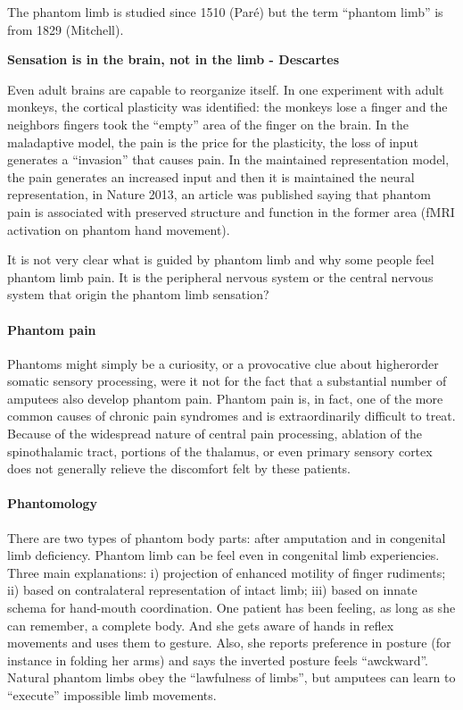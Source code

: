 \documentclass[12pt,article,oneside,a4paper]{memoir}
\begin{document}
The phantom limb is studied since 1510 (Paré) but the term ``phantom limb''
is from 1829 (Mitchell).

\textbf{Sensation is in the brain, not in the limb - Descartes}

Even adult brains are capable to reorganize itself. In one experiment with adult
monkeys, the cortical plasticity was identified: the monkeys lose a finger and
the neighbors fingers took the ``empty'' area of the finger on the brain.
In the maladaptive model, the pain is the price for the plasticity, the loss
of input generates a ``invasion'' that causes pain.
In the maintained representation model, the pain generates an increased input 
and then it is maintained the neural representation, in Nature 2013, an article
was published saying that phantom pain is associated with preserved structure
and function in the former area (fMRI activation on phantom hand movement).

It is not very clear what is guided by phantom limb and why some people feel 
phantom limb pain. It is the peripheral nervous system or the central nervous
system that origin the phantom limb sensation?

\paragraph{Phantom pain}
Phantoms might simply be a curiosity, or a provocative clue about higherorder 
somatic sensory processing, were it not for the fact that a substantial number 
of amputees also develop phantom pain. Phantom pain is, in fact, one of the 
more common causes of chronic pain syndromes and is extraordinarily difficult
to treat. Because of the widespread nature of central pain processing, ablation
of the spinothalamic tract, portions of the thalamus, or even primary sensory
cortex does not generally relieve the discomfort felt by these patients.

\paragraph{Phantomology}
There are two types of phantom body parts: after amputation and in congenital limb
deficiency.
Phantom limb can be feel even in congenital limb experiencies.
Three main explanations: i) projection of enhanced motility of finger rudiments;
ii) based on contralateral representation of intact limb; iii) based on innate
schema for hand-mouth coordination. 
One patient has been feeling, as long as she can remember, a complete body.
And she gets aware of hands in reflex movements and uses them to gesture.
Also, she reports preference in posture (for instance in folding her arms) and
says the inverted posture feels ``awckward''. Natural phantom limbs obey the
``lawfulness of limbs'', but amputees can learn to ``execute'' impossible limb
movements.
\end{document}
